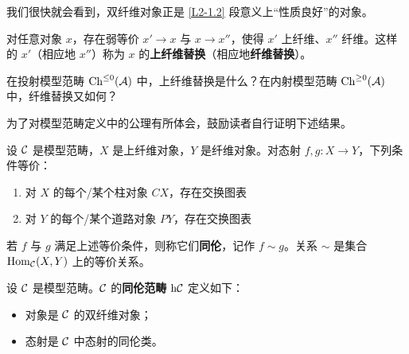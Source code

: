 \nitem\label{L2-2.15} 我们很快就会看到，双纤维对象正是 \ref{L2-1.2} 段意义上“性质良好”的对象。

\begin{exercise}\label{L2-2.16}
对任意对象 $x$，存在弱等价 $x'\to x$ 与 $x\to x''$，使得 $x'$ 上纤维、$x''$ 纤维。这样的 $x'$（相应地 $x''$）称为 $x$ 的\textbf{上纤维替换}（相应地\textbf{纤维替换}）。
\end{exercise}

\begin{exercise}\label{L2-2.17}
在投射模型范畴 $\operatorname{Ch}^{\le0}(\mathcal{A})$ 中，上纤维替换是什么？在内射模型范畴 $\operatorname{Ch}^{\ge0}(\mathcal{A})$ 中，纤维替换又如何？
\end{exercise}

\nitem\label{L2-2.18} 为了对模型范畴定义中的公理有所体会，鼓励读者自行证明下述结果。

\begin{theoremdef}\label{L2-2.19}
设 $\mathcal{C}$ 是模型范畴，$X$ 是上纤维对象，$Y$ 是纤维对象。对态射 $f,g\colon X\to Y$，下列条件等价：
\begin{enumerate}[label=(\arabic*),leftmargin=2.4em,itemsep=0.1em]
\item 对 $X$ 的每个/某个柱对象 $CX$，存在交换图表
\begin{center}
\end{center}
\item 对 $Y$ 的每个/某个道路对象 $PY$，存在交换图表
\begin{center}
\end{center}
\end{enumerate}
若 $f$ 与 $g$ 满足上述等价条件，则称它们\textbf{同伦}，记作 $f\sim g$。关系 $\sim$ 是集合 $\operatorname{Hom}_{\mathcal{C}}(X,Y)$ 上的等价关系。
\end{theoremdef}

\begin{definition}\label{L2-2.20}
设 $\mathcal{C}$ 是模型范畴。$\mathcal{C}$ 的\textbf{同伦范畴} $\mathrm{h}\mathcal{C}$ 定义如下：
\begin{itemize}[leftmargin=2.2em,itemsep=0.1em]
\item 对象是 $\mathcal{C}$ 的双纤维对象；
\item 态射是 $\mathcal{C}$ 中态射的同伦类。
\end{itemize}
\end{definition}

